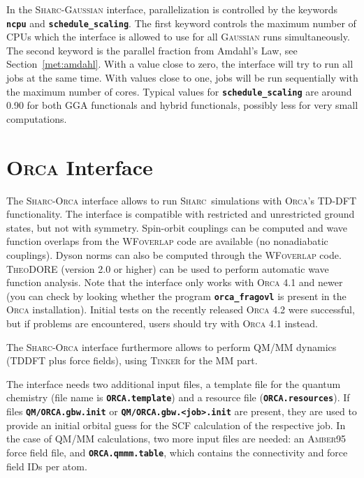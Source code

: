\documentclass[a4paper,10pt,DIV=15,openany]{scrbook}
\newcommand{\tthdump}[1]{#1}
\newcommand{\sharc}{\textsc{Sharc}}
\newcommand{\ttt}[1]{\textbf{\texttt{#1}}}
\begin{document}
In the \sharc-\textsc{Gaussian} interface, parallelization is controlled by the keywords \ttt{ncpu} and \ttt{schedule\_scaling}.
The first keyword controls the maximum number of CPUs which the interface is allowed to use for all \textsc{Gaussian} runs simultaneously.
The second keyword is the parallel fraction from Amdahl's Law, see Section~\ref{met:amdahl}.
With a value close to zero, the interface will try to run all jobs at the same time. With values close to one, jobs will be run sequentially with the maximum number of cores.
Typical values for \ttt{schedule\_scaling} are around 0.90 for both GGA functionals and hybrid functionals,  possibly less for very small computations.









\tthdump{\FloatBarrier}
\section{\textsc{Orca} Interface}\label{sec:int:orca}

The \sharc-\textsc{Orca} interface allows to run \sharc\ simulations with \textsc{Orca}'s TD-DFT functionality.
The interface is compatible with restricted and unrestricted ground states, but not with symmetry.
Spin-orbit couplings can be computed and wave function overlaps from the \textsc{WFoverlap} code are available (no nonadiabatic couplings).
Dyson norms can also be computed through the \textsc{WFoverlap} code.
\textsc{TheoDORE} (version 2.0 or higher) can be used to perform automatic wave function analysis.
Note that the interface only works with \textsc{Orca} 4.1 and newer (you can check by looking whether the program \ttt{orca\_fragovl} is present in the \textsc{Orca} installation).
Initial tests on the recently released \textsc{Orca} 4.2 were successful, but if problems are encountered, users should try with \textsc{Orca} 4.1 instead.

The \sharc-\textsc{Orca} interface furthermore allows to perform QM/MM dynamics (TDDFT plus force fields), using \textsc{Tinker} for the MM part.

The interface needs two additional input files, a template file for the quantum chemistry (file name is \ttt{ORCA.template}) and a resource file (\ttt{ORCA.resources}). 
If files \ttt{QM/ORCA.gbw.init} or \ttt{QM/ORCA.gbw.<job>.init} are present, they are used to provide an initial orbital guess for the SCF calculation of the respective job.
In the case of QM/MM calculations, two more input files are needed: an \textsc{Amber}95 force field file, and \ttt{ORCA.qmmm.table}, which contains the connectivity and force field IDs per atom.
\end{document}
